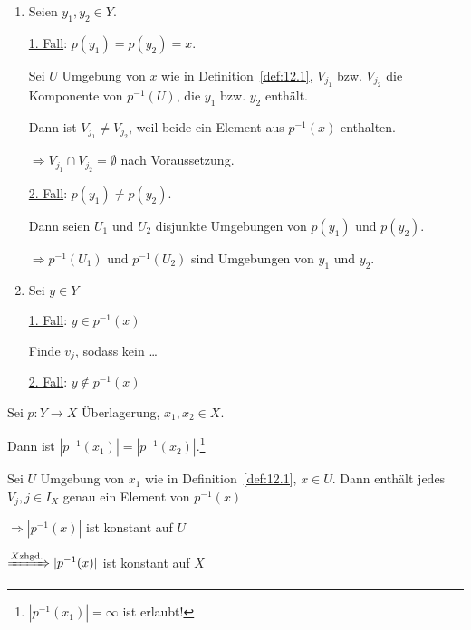 \begin{beweis}\leavevmode
    \begin{enumerate}[label=\alph*)]
        \item Seien $y_1, y_2 \in Y$.

        \underline{1. Fall}: $p(y_1) = p(y_2) = x$.

        Sei $U$ Umgebung von $x$ wie in Definition~\ref{def:12.1},
        $V_{j_1}$ bzw. $V_{j_2}$ die Komponente von $p^{-1}(U)$, die
        $y_1$ bzw. $y_2$ enthält.

        Dann ist $V_{j_1} \neq V_{j_2}$, weil beide ein Element aus $p^{-1}(x)$
        enthalten.

        $\Rightarrow V_{j_1} \cap V_{j_2} = \emptyset$ nach Voraussetzung.

        \underline{2. Fall}: $p(y_1) \neq p(y_2)$.
        
        Dann seien $U_1$ und $U_2$ disjunkte Umgebungen von $p(y_1)$
        und $p(y_2)$.

        $\Rightarrow p^{-1}(U_1)$ und $p^{-1}(U_2)$ sind Umgebungen von
        $y_1$ und $y_2$.

        \item Sei $y \in Y$

        \underline{1. Fall}: $y \in p^{-1}(x)$

        Finde $v_j$, sodass kein \dots 

        \underline{2. Fall}: $y \notin p^{-1}(x)$

    \end{enumerate}
\end{beweis}

\begin{korollar}\label{kor:12.4}%
    Sei $p: Y \rightarrow X$ Überlagerung, $x_1, x_2 \in X$.

    Dann ist $|p^{-1} (x_1)| = |p^{-1}(x_2)|$.\footnote{$|p^{-1} (x_1)| = \infty$ ist erlaubt!}
\end{korollar}

\begin{beweis}
    Sei $U$ Umgebung von $x_1$ wie in Definition~\ref{def:12.1}, $x \in U$.
    Dann enthält jedes $V_j, j \in I_X$ genau ein Element von
    $p^{-1}(x)$

    $\Rightarrow |p^{-1} (x)|$ ist konstant auf $U$

    $\xRightarrow{X \text{zhgd.}} |p^{-1}(x)|$  ist konstant auf $X$
\end{beweis}

